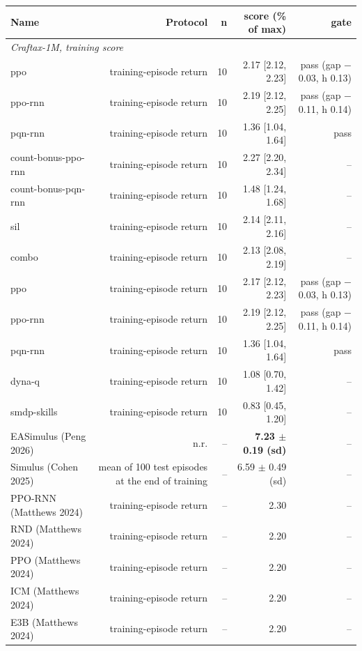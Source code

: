 \begin{tabular}{lrrrr}
\toprule
Name & Protocol & n & score (\% of max) & gate \\
\midrule
\multicolumn{5}{l}{\emph{Craftax-1M, training score}} \\
ppo & training-episode return & 10 & 2.17 [2.12, 2.23] & pass (gap \ensuremath{-}0.03, h 0.13) \\
ppo-rnn & training-episode return & 10 & 2.19 [2.12, 2.25] & pass (gap \ensuremath{-}0.11, h 0.14) \\
pqn-rnn & training-episode return & 10 & 1.36 [1.04, 1.64] & pass \\
count-bonus-ppo-rnn & training-episode return & 10 & 2.27 [2.20, 2.34] & -- \\
count-bonus-pqn-rnn & training-episode return & 10 & 1.48 [1.24, 1.68] & -- \\
sil & training-episode return & 10 & 2.14 [2.11, 2.16] & -- \\
combo & training-episode return & 10 & 2.13 [2.08, 2.19] & -- \\
ppo & training-episode return & 10 & 2.17 [2.12, 2.23] & pass (gap \ensuremath{-}0.03, h 0.13) \\
ppo-rnn & training-episode return & 10 & 2.19 [2.12, 2.25] & pass (gap \ensuremath{-}0.11, h 0.14) \\
pqn-rnn & training-episode return & 10 & 1.36 [1.04, 1.64] & pass \\
dyna-q & training-episode return & 10 & 1.08 [0.70, 1.42] & -- \\
smdp-skills & training-episode return & 10 & 0.83 [0.45, 1.20] & -- \\
EASimulus (Peng 2026) & n.r. & -- & \textbf{7.23 $\pm$ 0.19 (sd)} & -- \\
Simulus (Cohen 2025) & mean of 100 test episodes at the end of training & -- & 6.59 $\pm$ 0.49 (sd) & -- \\
PPO-RNN (Matthews 2024) & training-episode return & -- & 2.30 & -- \\
RND (Matthews 2024) & training-episode return & -- & 2.20 & -- \\
PPO (Matthews 2024) & training-episode return & -- & 2.20 & -- \\
ICM (Matthews 2024) & training-episode return & -- & 2.20 & -- \\
E3B (Matthews 2024) & training-episode return & -- & 2.20 & -- \\
\bottomrule
\end{tabular}
